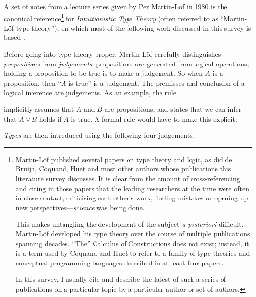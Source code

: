 \documentclass[12pt,toc=bibliography,numbers=noendperiod,
               footnotes=multiple,twoside]{scrartcl}
\begin{document}
A set of notes from a lecture series given by Per Martin-Löf in 1980 is the canonical reference\footnote{%
Martin-Löf published several papers on type theory and logic, as did de Bruijn, Coquand, Huet and most other authors whose publications this literature survey discusses. It is clear from the amount of cross-referencing and citing in those papers that the leading researchers at the time were often in close contact, criticising each other's work, finding mistakes or opening up new perspectives---\emph{science} was being done.

This makes untangling the development of the subject \emph{a posteriori} difficult. Martin-Löf developed his type theory over the course of multiple publications spanning decades. \enquote{The} Calculus of Constructions does not exist; instead, it is a term used by Coquand and Huet to refer to a family of type theories and conceptual programming languages described in at least four papers.

In this survey, I usually cite and describe the latest of such a series of publications on a particular topic by a particular author or set of authors.}
%
for \emph{Intuitionistic Type Theory} (often referred to as \enquote{Martin-Löf type theory}), on which most of the following work discussed in this survey is based \autocite{sambin_intuitionistic_1984}.

Before going into type theory proper, Martin-Löf carefully distinguishes \emph{propositions} from \emph{judgements}: propositions are generated from logical operations; holding a proposition to be true is to make a judgement. So when \(A\) is a proposition, then \enquote{\(A\) is true} is a judgement. The premisses and conclusion of a logical inference are judgements. As an example, the rule

\begin{prooftree}
\end{prooftree}

implicitly assumes that \(A\) and \(B\) are propositions, and states that we can infer that \(A \vee B\) holds if \(A\) is true. A formal rule would have to make this explicit:

\begin{prooftree}
\end{prooftree}

\emph{Types} are then introduced using the following four judgements:
\end{document}
